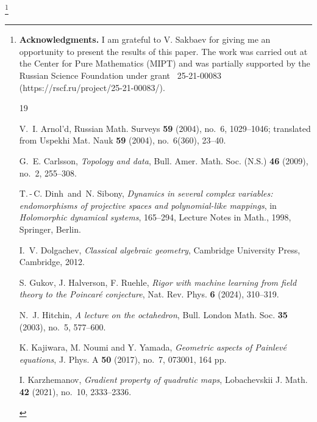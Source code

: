 \documentclass[14pt]{amsart}
\theoremstyle{definition}
\theoremstyle{remark}
\begin{document}
\bigskip

\bigskip

\thanks{{\bf Acknowledgments.}
I am grateful to V. Sakbaev for giving me an opportunity to
present the results of this paper. The work was carried out at the
Center for Pure Mathematics (MIPT) and was partially supported by
the Russian Science Foundation under grant \textnumero\,
25-21-00083 (https://rscf.ru/project/25-21-00083/).

\bigskip

\begin{thebibliography}{19}

V.~I. Arnol'd, Russian Math. Surveys {\bf 59} (2004), no.~6,
1029--1046; translated from Uspekhi Mat. Nauk {\bf 59} (2004),
no.~6(360), 23--40.

\smallskip

G.~E. Carlsson, {\it Topology and data}, Bull. Amer. Math. Soc.
(N.S.) {\bf 46} (2009), no.~2, 255--308.

\smallskip

T.\,-\,C. Dinh\ and\ N. Sibony, {\it Dynamics in several complex
variables: endomorphisms of projective spaces and polynomial-like
mappings}, in {\it Holomorphic dynamical systems}, 165--294,
Lecture Notes in Math., 1998, Springer, Berlin.

\smallskip

I.\, V. Dolgachev, {\it Classical algebraic geometry}, Cambridge
University Press, Cambridge, 2012.

\smallskip

S. Gukov, J. Halverson, F. Ruehle, {\it Rigor with machine
learning from field theory to the Poincar\'e conjecture}, Nat.
Rev. Phys. {\bf 6} (2024), 310--319.

\smallskip

N.~J. Hitchin, {\it A lecture on the octahedron}, Bull. London
Math. Soc. {\bf 35} (2003), no.~5, 577--600.

\smallskip

K. Kajiwara, M. Noumi and Y. Yamada, {\it Geometric aspects of
Painlev\'e{} equations}, J. Phys. A {\bf 50} (2017), no.~7,
073001, 164 pp.

\smallskip

I. Karzhemanov, {\it Gradient property of quadratic maps},
Lobachevskii J. Math. {\bf 42} (2021), no.~10, 2333--2336.


\end{thebibliography}}
\end{document}
